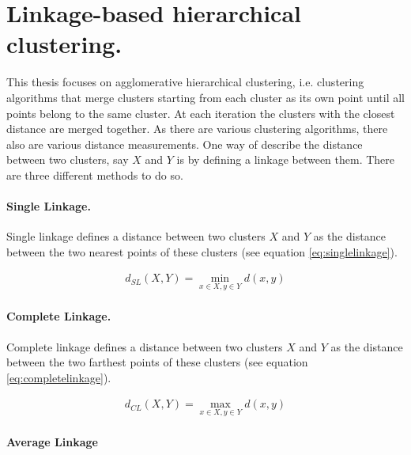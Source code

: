 \section{Linkage-based hierarchical clustering.}

This thesis focuses on agglomerative hierarchical clustering, i.e. clustering algorithms that merge clusters starting from each cluster as its own point until all points belong to the same cluster. At each iteration the clusters with the closest distance are merged together. As there are various clustering algorithms, there also are various distance measurements. One way of describe the distance between two clusters, say $X$ and $Y$ is by defining a linkage between them. There are three different methods to do so.

\paragraph{Single Linkage.}

Single linkage defines a distance between two clusters $X$ and $Y$ as the distance between the two nearest points of these clusters (see equation \ref{eq:singlelinkage}).

\begin{equation}
    \begin{aligned}
        d_{SL}(X,Y) = \min\limits_{x \in X, y \in Y} d(x,y)
    \end{aligned}
    \label{eq:singlelinkage}
\end{equation}

\paragraph{Complete Linkage.}

Complete linkage defines a distance between two clusters $X$ and $Y$ as the distance between the two farthest points of these clusters (see equation \ref{eq:completelinkage}).

\begin{equation}
    \begin{aligned}
        d_{CL}(X,Y) = \max\limits_{x \in X, y \in Y} d(x,y)
    \end{aligned}
    \label{eq:completelinkage}
\end{equation}

\paragraph{Average Linkage}

